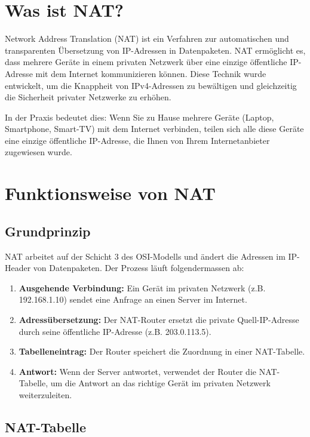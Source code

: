 \documentclass[
  nswissgerman,
  a4paper,
  DIV=11,
  numbers=noendperiod,
  ngerman]{scrreprt}
\providecommand{\tightlist}{%
  \setlength{\itemsep}{0pt}\setlength{\parskip}{0pt}}
\begin{document}
\section{Was ist NAT?}\label{was-ist-nat}

Network Address Translation (NAT) ist ein Verfahren zur automatischen
und transparenten Übersetzung von IP-Adressen in Datenpaketen. NAT
ermöglicht es, dass mehrere Geräte in einem privaten Netzwerk über eine
einzige öffentliche IP-Adresse mit dem Internet kommunizieren können.
Diese Technik wurde entwickelt, um die Knappheit von IPv4-Adressen zu
bewältigen und gleichzeitig die Sicherheit privater Netzwerke zu
erhöhen.

In der Praxis bedeutet dies: Wenn Sie zu Hause mehrere Geräte (Laptop,
Smartphone, Smart-TV) mit dem Internet verbinden, teilen sich alle diese
Geräte eine einzige öffentliche IP-Adresse, die Ihnen von Ihrem
Internetanbieter zugewiesen wurde.

\section{Funktionsweise von NAT}\label{funktionsweise-von-nat}

\subsection{Grundprinzip}\label{grundprinzip-1}

NAT arbeitet auf der Schicht 3 des OSI-Modells und ändert die Adressen
im IP-Header von Datenpaketen. Der Prozess läuft folgendermassen ab:

\begin{enumerate}
\def\labelenumi{\arabic{enumi}.}
\tightlist
\item
  \textbf{Ausgehende Verbindung:} Ein Gerät im privaten Netzwerk (z.B.
  192.168.1.10) sendet eine Anfrage an einen Server im Internet.
\item
  \textbf{Adressübersetzung:} Der NAT-Router ersetzt die private
  Quell-IP-Adresse durch seine öffentliche IP-Adresse (z.B.
  203.0.113.5).
\item
  \textbf{Tabelleneintrag:} Der Router speichert die Zuordnung in einer
  NAT-Tabelle.
\item
  \textbf{Antwort:} Wenn der Server antwortet, verwendet der Router die
  NAT-Tabelle, um die Antwort an das richtige Gerät im privaten Netzwerk
  weiterzuleiten.
\end{enumerate}

\subsection{NAT-Tabelle}\label{nat-tabelle}
\end{document}
